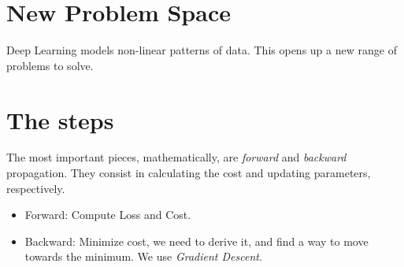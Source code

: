 
\section{New Problem Space}
Deep Learning models non-linear patterns of data. This opens up a new range of problems to solve. 

\section{The steps}
The most important pieces, mathematically, are \textit{forward} and \textit{backward} propagation. They consist in calculating the cost and updating parameters, respectively.

\begin{itemize}
\item Forward: Compute Loss and Cost. 
\item Backward: Minimize cost, we need to derive it, and find a way to move towards the minimum. We use \textit{Gradient Descent}.
\end{itemize}

